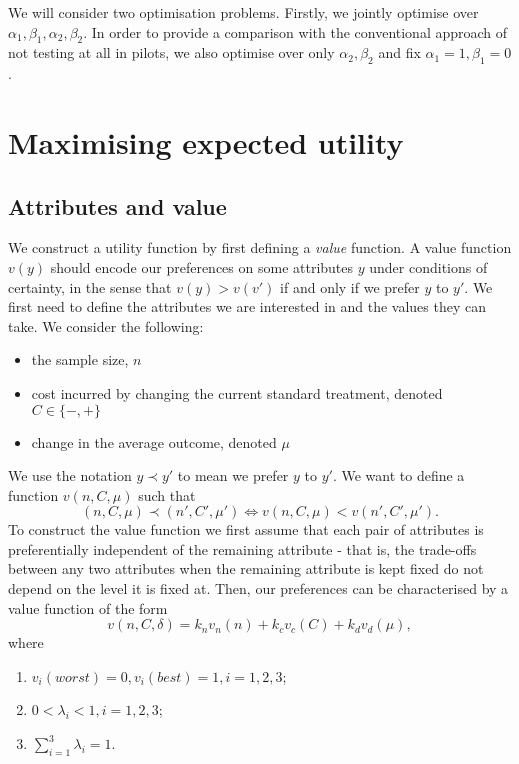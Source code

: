 \documentclass[sagev]{sagej}
\begin{document}
We will consider two optimisation problems. Firstly, we jointly optimise over $\alpha_1, \beta_1, \alpha_2, \beta_2$. In order to provide a comparison with the conventional approach of not testing at all in pilots, we also optimise over only $\alpha_2, \beta_2$ and fix $\alpha_1 = 1, \beta_1 = 0$.

\section{Maximising expected utility}

\subsection{Attributes and value}

We construct a utility function by first defining a \emph{value} function. A value function $v(y)$ should encode our preferences on some attributes $y$ under conditions of certainty, in the sense that $v(y) > v(v')$ if and only if we prefer $y$ to $y'$. We first need to define the attributes we are interested in and the values they can take. We consider the following:

\begin{itemize}
\item the sample size, $n$ 
\item cost incurred by changing the current standard treatment, denoted $C \in \{-,+\}$
\item change in the average outcome, denoted $\mu$
\end{itemize}

We use the notation $y \prec y'$ to mean we prefer $y$ to $y'$. We want to define a function $v(n, C, \mu)$ such that
$$
(n, C, \mu) \prec (n', C', \mu') \Leftrightarrow v(n, C, \mu) < v(n', C', \mu').
$$
To construct the value function we first assume that each pair of attributes is preferentially independent of the remaining attribute - that is, the trade-offs between any two attributes when the remaining attribute is kept fixed do not depend on the level it is fixed at. Then, our preferences can be characterised by a value function of the form 
$$ 
v(n, C, \delta) = k_n v_n(n) + k_c v_c(C) + k_d v_d(\mu),
$$
where
\begin{enumerate}
\item $v_i(worst) = 0, v_i(best) = 1, i = 1,2,3$;
\item $0 < \lambda_i < 1, i = 1,2,3$;
\item $\sum_{i=1}^3 \lambda_i = 1$.
\end{enumerate}
\end{document}

